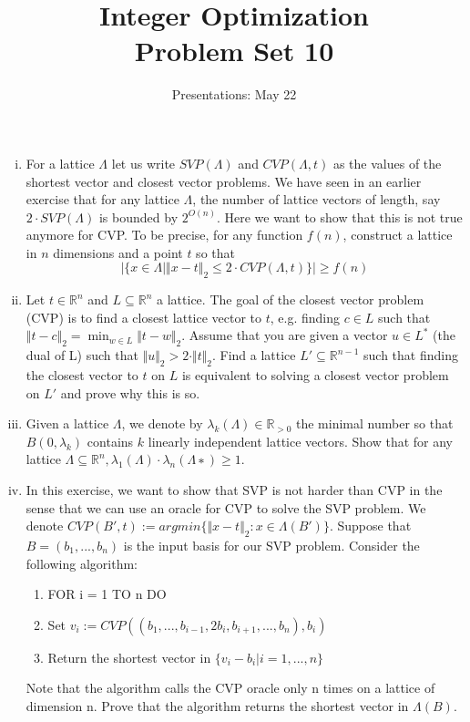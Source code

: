 \documentclass[11pt,a4paper]{article}
\title{Integer Optimization  \\ Problem Set 10 }
\date{Presentations: May 22}
\newcommand{\setR}{\mathbb{R}}
\begin{document}
\maketitle 




\begin{enumerate}[i)]
\item For a lattice $Λ$ let us write $SVP(Λ)$ and $CVP(Λ,t)$ as the values of the shortest vector and closest vector problems. We have seen in an earlier exercise that for any lattice $Λ$, the number of lattice vectors of length, say $2\cdot SVP(Λ)$ is bounded by $2^{O(n)}$. Here we want to show that this is not true anymore
for CVP. To be precise, for any function $f(n)$, construct a lattice in $n$ dimensions and a point $t$ so that
$$|\{x ∈ Λ | \Vert x − t\Vert_2 ≤ 2 \cdot CVP(Λ,t)\}| ≥ f (n)$$




\item Let $t ∈ \setR^n$ and $L ⊆ \setR^n$ a lattice. The goal of the closest vector problem (CVP) is to find a closest lattice
vector to $t$, e.g. finding $c ∈ L$ such that $\Vert t − c\Vert_2 = \min_{w∈L} \Vert t − w\Vert_2$. Assume that you are given a vector $u ∈ L^\ast$ (the dual of L) such that $\Vert u\Vert_2 > 2 \cdot \Vert t\Vert_2$. Find a lattice $L' ⊆ \setR^{n−1}$ such that finding the closest vector to $t$ on $L$ is equivalent to
solving a closest vector problem on $L'$ and prove why this is so.

\item Given a lattice $Λ$, we denote by $λ_k(Λ) ∈ \setR_{>0}$ the minimal number so that $B(0, λ_k)$ contains $k$ linearly
independent lattice vectors. Show that for any lattice $Λ ⊆ \setR^n,  λ_1(Λ) \cdot λ_n(Λ∗) ≥ 1$.


\item In this exercise, we want to show that SVP is not harder than CVP in the sense that we can use an oracle for CVP to solve the SVP problem. We denote $CVP(B',t) := argmin\{\Vert x − t\Vert_2 : x ∈ Λ(B')\}$. Suppose that $B = (b_1,...,b_n)$ is the input basis for our SVP problem. Consider the following algorithm:
\begin{enumerate}
    \item FOR i = 1 TO n DO
    \item Set $v_i:= CVP((b_1,...,b_{i−1}, 2b_i,b_{i+1},...,b_n),b_i)$
    \item Return the shortest vector in $\{v_i −b_i| i = 1,...,n\}$
\end{enumerate}
Note that the algorithm calls the CVP oracle only n times on a lattice of dimension n. Prove that the algorithm returns the shortest vector in $Λ(B)$.


\end{enumerate}
\end{document}
